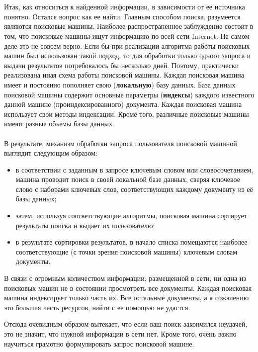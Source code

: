 {\hypertarget{lesson26x4}{}}\\\\

Итак, как относиться к найденной информации, в зависимости от ее источника понятно. Остался вопрос как ее найти. Главным способом поиска, разумеется являются поисковые машины. Наиболее распространенное заблуждение состоит в том, что  поисковые машины ищут информацию по всей сети Internet. На самом деле это не совсем верно. Если бы при реализации алгоритма работы поисковых машин был использован такой подход, то для обработки только одного запроса и выдачи результатов потребовалось бы несколько дней. Поэтому, практически реализована иная схема работы поисковой машины. Каждая поисковая машина имеет и постоянно пополняет свою ({\bfseries локальную}) базу данных. База данных поисковой машины содержит основные параметры ({\bfseries индексы}) каждого известного данной машине (проиндексированного) документа. Каждая поисковая машина использует свои методы индексации. Кроме того, различные поисковые машины имеют разные объемы базы данных.\\\\

В результате, механизм обработки запроса пользователя поисковой машиной выглядит следующим образом:

\begin{itemize}
	\item в соответствии с заданным в запросе ключевым словом или словосочетанием, машина проводит поиск в своей локальной базе данных, сверяя ключевое слово с наборами ключевых слов, соответствующих каждому документу из её базы данных;
	\item затем, используя соответствующие алгоритмы, поисковая машина сортирует результаты поиска и выдает их пользователю;
	\item в результате сортировки результатов, в начало списка помещаются наиболее соответствующие (с точки зрения поисковой машины) ключевым словам документы.
\end{itemize}

В связи с огромным количеством информации, размещенной в сети, ни одна из поисковых машин не в состоянии просмотреть все документы. Каждая поисковая машина индексирует только часть их. Все остальные документы, а к сожалению это большая часть ресурсов, найти с ее помощью не удастся.

Отсюда очевидным образом вытекает, что если ваш поиск закончился неудачей, это не значит, что нужной информации в сети нет. Кроме того, очень важно научиться грамотно формулировать запрос поисковой машине.\\\\

